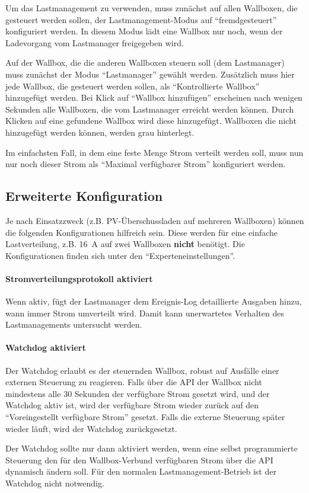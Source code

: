 \documentclass[a4paper,10pt]{article}
\newcommand{\hint}[1]{\begin{tcolorbox}[colback=boxgray,colframe=black,coltext=
white,title=Hinweis,left*=2mm,right*=2mm,boxsep=1mm,bottom=1mm,top=1mm]#1\end{tcolorbox}}
\begin{document}
\begin{multicols*}{2}
	Um das Lastmanagement zu verwenden, muss zunächst auf allen Wallboxen, die gesteuert werden sollen,
	der Lastmanagement-Modus auf \enquote{fremdgesteuert} konfiguriert werden.
	In diesem Modus lädt eine Wallbox nur noch, wenn der Ladevorgang vom Lastmanager freigegeben wird.

	Auf der Wallbox, die die anderen Wallboxen steuern soll (dem Lastmanager) muss zunächst der Modus \enquote{Lastmanager} gewählt werden.
	Zusätzlich muss hier jede Wallbox, die gesteuert werden sollen, als \enquote{Kontrollierte Wallbox} hinzugefügt werden.
	Bei Klick auf \enquote{Wallbox hinzufügen} erscheinen nach wenigen Sekunden alle Wallboxen, die vom Lastmanager erreicht werden können.
	Durch Klicken auf eine gefundene Wallbox wird diese hinzugefügt. Wallboxen die nicht hinzugefügt werden können, werden grau hinterlegt.

	Im einfachsten Fall, in dem eine feste Menge Strom verteilt werden soll, muss nun nur noch dieser
	Strom als \enquote{Maximal verfügbarer Strom} konfiguriert werden.

	\subsection{Erweiterte Konfiguration}
	Je nach Einsatzzweck (z.B. PV-Überschussladen auf mehreren Wallboxen) können die folgenden Konfigurationen hilfreich sein.
	Diese werden für eine einfache Lastverteilung, z.B. \SI{16}{\ampere} auf zwei Wallboxen \textbf{nicht} benötigt.
	Die Konfigurationen finden sich unter den \enquote{Experteneinstellungen}.
	\vspace{-0.2cm}
	\paragraph{Stromverteilungsprotokoll aktiviert}
	Wenn aktiv, fügt der Lastmanager dem Ereignis-Log detaillierte Ausgaben hinzu, wann immer Strom umverteilt wird. Damit kann unerwartetes Verhalten des
	Lastmanagements untersucht werden.

	\paragraph{Watchdog aktiviert}
	Der Watchdog erlaubt es der steuernden Wallbox, robust auf Ausfälle einer externen Steuerung zu reagieren. Falls über die API der Wallbox
	nicht mindestens alle 30 Sekunden der verfügbare Strom gesetzt wird, und der Watchdog aktiv ist, wird der verfügbare Strom wieder zurück auf den
	\enquote{Voreingestellt verfügbare Strom} gesetzt. Falls die externe Steuerung später wieder läuft, wird der Watchdog zurückgesetzt.
	\hint{Der Watchdog sollte nur dann aktiviert werden,
	wenn eine selbst programmierte Steuerung den für den Wallbox-Verbund verfügbaren Strom über die API dynamisch ändern soll.
	Für den normalen Lastmanagement-Betrieb ist der Watchdog nicht notwendig.}


\end{multicols*}
\end{document}
